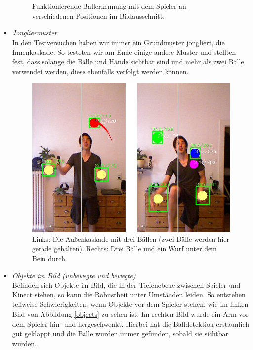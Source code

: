 \documentclass[12pt,a4paper,ngerman]{scrartcl}
\begin{document}
\begin{itemize}
\begin{figure}[H]
    \caption{Funktionierende Ballerkennung mit dem Spieler an verschiedenen Positionen im Bildausschnitt.}
\end{figure}
\item {\em Jongliermuster}\\
In den Testversuchen haben wir immer ein Grundmuster jongliert, die Innenkaskade. So testeten wir am Ende einige andere Muster und stellten fest, dass solange die Bälle und Hände sichtbar sind und mehr als zwei Bälle verwendet werden, diese ebenfalls verfolgt werden können.
\begin{figure}[H]
    \centering
    \includegraphics[scale=0.5]{img/bewertung_muster.jpg}
    \caption{Links: Die Außenkaskade mit drei Bällen (zwei Bälle werden hier gerade gehalten). Rechts: Drei Bälle und ein Wurf unter dem Bein durch.}
\end{figure}
\item {\em Objekte im Bild (unbewegte und bewegte)}\\
Befinden sich Objekte im Bild, die in der Tiefenebene zwischen Spieler und Kinect stehen, so kann die Robustheit unter Umständen leiden. So entstehen teilweise Schwierigkeiten, wenn Objekte vor dem Spieler stehen, wie im linken Bild von Abbildung \ref{objects} zu sehen ist. Im rechten Bild wurde ein Arm vor dem Spieler hin- und hergeschwenkt. Hierbei hat die Balldetektion erstaunlich gut geklappt und die Bälle wurden immer gefunden, sobald sie sichtbar wurden.
\begin{figure}[H]
    \centering

\end{figure}
\end{itemize}
\end{document}
